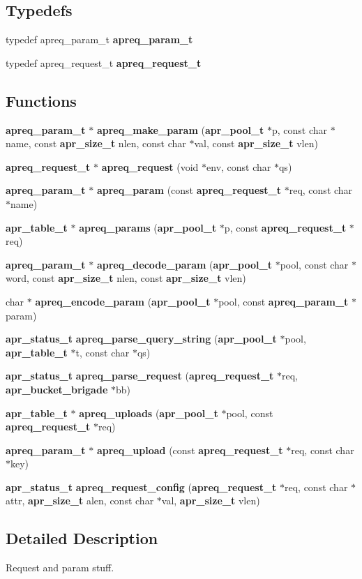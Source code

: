 \subsection*{Typedefs}
\begin{CompactItemize}
\item 
typedef apreq\_\-param\_\-t {\bf apreq\_\-param\_\-t}
\item 
typedef apreq\_\-request\_\-t {\bf apreq\_\-request\_\-t}
\end{CompactItemize}
\subsection*{Functions}
\begin{CompactItemize}
\item 
{\bf apreq\_\-param\_\-t} $\ast$ {\bf apreq\_\-make\_\-param} ({\bf apr\_\-pool\_\-t} $\ast$p, const char $\ast$name, const {\bf apr\_\-size\_\-t} nlen, const char $\ast$val, const {\bf apr\_\-size\_\-t} vlen)
\item 
{\bf apreq\_\-request\_\-t} $\ast$ {\bf apreq\_\-request} (void $\ast$env, const char $\ast$qs)
\item 
{\bf apreq\_\-param\_\-t} $\ast$ {\bf apreq\_\-param} (const {\bf apreq\_\-request\_\-t} $\ast$req, const char $\ast$name)
\item 
{\bf apr\_\-table\_\-t} $\ast$ {\bf apreq\_\-params} ({\bf apr\_\-pool\_\-t} $\ast$p, const {\bf apreq\_\-request\_\-t} $\ast$req)
\item 
{\bf apreq\_\-param\_\-t} $\ast$ {\bf apreq\_\-decode\_\-param} ({\bf apr\_\-pool\_\-t} $\ast$pool, const char $\ast$word, const {\bf apr\_\-size\_\-t} nlen, const {\bf apr\_\-size\_\-t} vlen)
\item 
char $\ast$ {\bf apreq\_\-encode\_\-param} ({\bf apr\_\-pool\_\-t} $\ast$pool, const {\bf apreq\_\-param\_\-t} $\ast$param)
\item 
{\bf apr\_\-status\_\-t} {\bf apreq\_\-parse\_\-query\_\-string} ({\bf apr\_\-pool\_\-t} $\ast$pool, {\bf apr\_\-table\_\-t} $\ast$t, const char $\ast$qs)
\item 
{\bf apr\_\-status\_\-t} {\bf apreq\_\-parse\_\-request} ({\bf apreq\_\-request\_\-t} $\ast$req, {\bf apr\_\-bucket\_\-brigade} $\ast$bb)
\item 
{\bf apr\_\-table\_\-t} $\ast$ {\bf apreq\_\-uploads} ({\bf apr\_\-pool\_\-t} $\ast$pool, const {\bf apreq\_\-request\_\-t} $\ast$req)
\item 
{\bf apreq\_\-param\_\-t} $\ast$ {\bf apreq\_\-upload} (const {\bf apreq\_\-request\_\-t} $\ast$req, const char $\ast$key)
\item 
{\bf apr\_\-status\_\-t} {\bf apreq\_\-request\_\-config} ({\bf apreq\_\-request\_\-t} $\ast$req, const char $\ast$attr, {\bf apr\_\-size\_\-t} alen, const char $\ast$val, {\bf apr\_\-size\_\-t} vlen)\label{apreq__params_8h_a19}

\end{CompactItemize}


\subsection{Detailed Description}
Request and param stuff.

